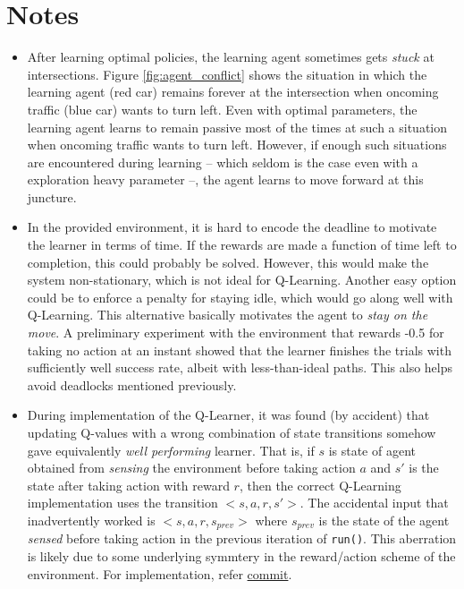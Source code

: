 \documentclass{article}
\begin{document}
	\section{Notes}	\label{notes}
	\begin{itemize}
		\item After learning optimal policies, the learning agent sometimes gets \emph{stuck} at intersections. Figure \ref{fig:agent_conflict} shows the situation in which the learning agent (red car) remains forever at the intersection when oncoming traffic (blue car) wants to turn left. Even with optimal parameters, the learning agent learns to remain passive most of the times at such a situation when oncoming traffic wants to turn left. However, if enough such situations are encountered during learning -- which seldom is the case even with a exploration heavy parameter --, the agent learns to move forward at this juncture.
		\item In the provided environment, it is hard to encode the deadline to motivate the learner in terms of time. If the rewards are made a function of time left to completion, this could probably be solved. However, this would make the system non-stationary, which is not ideal for Q-Learning. Another easy option could be to enforce a penalty for staying idle, which would go along well with Q-Learning. This alternative basically motivates the agent to \emph{stay on the move}. A preliminary experiment with the environment that rewards -0.5 for taking no action at an instant showed that the learner finishes the trials with sufficiently well success rate, albeit with less-than-ideal paths. This also helps avoid deadlocks mentioned previously.
		\item During implementation of the Q-Learner, it was found (by accident) that updating Q-values with a wrong combination of state transitions somehow gave equivalently \emph{well performing} learner. That is, if $s$ is state of agent obtained from \emph{sensing} the environment before taking action $a$ and $s\prime$ is the state after taking action with reward $r$, then the correct Q-Learning implementation uses the transition $<s, a, r, s\prime>$. The accidental input that inadvertently worked is $<s, a, r, s_{prev}>$ where $s_{prev}$ is the state of the agent \emph{sensed} before taking action in the previous iteration of \texttt{run()}. This aberration is likely due to some underlying symmtery in the reward/action scheme of the environment. For implementation, refer \href{https://github.com/QuaziRandom/MLND_Project_4/tree/870f14d912e8e9fbec4da7b2008cd2bf522f8b25}{commit}.
	\end{itemize}
\end{document}
